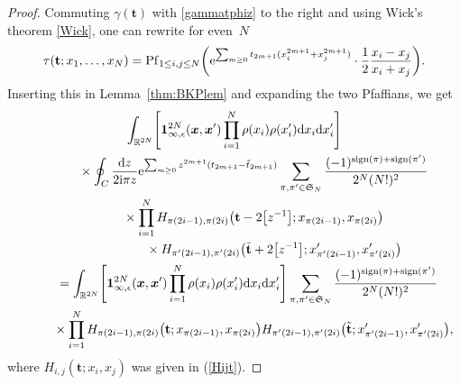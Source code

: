 \documentclass[10pt,a4paper]{amsart}
\numberwithin{equation}{section}
\newcommand{\dd}{\mathrm{d}}
\begin{document}
\begin{proof}
Commuting $\gamma(\mathbf{t})$ with \eqref{gammatphiz} to the right and using
Wick's theorem \eqref{Wick}, one can rewrite for even~$N$
\[
\tau(\mathbf{t};x_1,\dots,x_N) = \operatorname{Pf}_{1 \leq i,j \leq N} \biggl({\rm e}^{\sum_{m \geq 0} t_{2m + 1}(x_i^{2m + 1} + x_j^{2m + 1})}\cdot \frac{1}{2} \frac{x_i - x_j}{x_i + x_j}\biggr).
\]
Inserting this in Lemma~\ref{thm:BKPlem} and expanding the two Pfaffians, we get
\begin{gather}
 \int_{\mathbb{R}^{2N}} \Biggl[ \mathbf{1}_{\infty,\epsilon}^{2N}(\boldsymbol{x},\boldsymbol{x}') \prod_{i = 1}^{N} \rho(x_i)\rho(x_i')\dd x_i \dd x_i' \Biggr] \nonumber
 \\
 \qquad\quad{} \times \oint_C\frac{\dd z}{2{\rm i}\pi z} {\rm e}^{\sum_{m \geq 0} z^{2m+1}(t_{2m+1}-\tilde{t}_{2m+1})}
 \sum_{\pi,\pi'\in \mathfrak{S}_N}
 \frac{ (-1)^{\mathrm{sign}(\pi)+\mathrm{sign}(\pi')}}{
 2^{N}(N!)^2} \nonumber
\\
\qquad \quad{} \times \prod_{i=1}^N H_{\pi(2i-1),\pi(2i)}\bigl(\mathbf{t}
-2\bigl[z^{-1}\bigr];x_{\pi(2i-1)},x_{\pi(2i)}\bigr) \nonumber
\\ \qquad \qquad{} \hphantom{\times \prod_{i=1}^N}{}
\times H_{\pi'(2i-1),\pi'(2i)}\bigl(\tilde{\mathbf{t}}+2\bigl[z^{-1}\bigr];
x'_{\pi'(2i-1)},x'_{\pi'(2i)}\bigr) \nonumber
\\
\qquad{} =
\int_{\mathbb{R}^{2N}}
 \Biggl[ \mathbf{1}_{\infty,\epsilon}^{2N}(\boldsymbol{x},\boldsymbol{x}') \prod_{i = 1}^{N} \rho(x_i)\rho(x_i')\dd x_i \dd x_i' \Biggr]
 \sum_{\pi,\pi'\in \mathfrak{S}_N}
 \frac{ (-1)^{\mathrm{sign}(\pi)+\mathrm{sign}(\pi')}}{
 2^{N}(N!)^2} \nonumber
\\
\qquad\quad{} \times \prod_{i=1}^N H_{\pi(2i-1),\pi(2i)}\bigl(\mathbf{t};x_{\pi(2i-1)},x_{\pi(2i)}\bigr)
 H_{\pi'(2i-1),\pi'(2i)}\bigl(\tilde{\mathbf{t}};x'_{\pi'(2i-1)},x'_{\pi'(2i)}\bigr),\label{expanH}
\end{gather}
where $H_{i,j}(\mathbf{t};x_i,x_j)$ was given in (\ref{Hijt}).


\end{proof}
\end{document}
